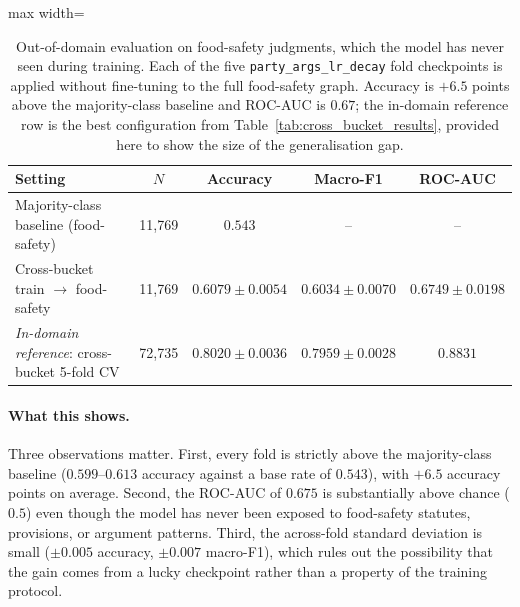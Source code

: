 \begin{table}[H]
  \centering
  \small
  \begin{adjustbox}{max width=\textwidth}
  \begin{tabular}{lcccc}
    \toprule
    Setting & $N$ & Accuracy & Macro-F1 & ROC-AUC \\
    \midrule
    Majority-class baseline (food-safety) & 11{,}769 & $0.543$ & -- & -- \\
    Cross-bucket train $\to$ food-safety & 11{,}769 & $0.6079\pm0.0054$ & $0.6034\pm0.0070$ & $0.6749\pm0.0198$ \\
    \midrule
    \emph{In-domain reference}: cross-bucket 5-fold CV
      & 72{,}735 & $0.8020\pm0.0036$ & $0.7959\pm0.0028$ & $0.8831$ \\
    \bottomrule
  \end{tabular}
  \end{adjustbox}
  \caption{Out-of-domain evaluation on food-safety judgments, which
  the model has never seen during training. Each of the five
  \texttt{party\_args\_lr\_decay} fold checkpoints is applied without
  fine-tuning to the full food-safety graph. Accuracy is $+6.5$
  points above the majority-class baseline and ROC-AUC is $0.67$;
  the in-domain reference row is the best configuration from
  Table~\ref{tab:cross_bucket_results}, provided here to show the
  size of the generalisation gap.}
  \label{tab:cross_domain_food_safety}
\end{table}

\paragraph{What this shows.}
Three observations matter. First, every fold is strictly above the
majority-class baseline ($0.599$--$0.613$ accuracy against a
base rate of $0.543$), with $+6.5$ accuracy points on average.
Second, the ROC-AUC of $0.675$ is substantially above chance
($0.5$) even though the model has never been exposed to food-safety
statutes, provisions, or argument patterns. Third, the across-fold
standard deviation is small
($\pm 0.005$ accuracy, $\pm 0.007$ macro-F1), which rules out the
possibility that the gain comes from a lucky checkpoint rather than
a property of the training protocol.

